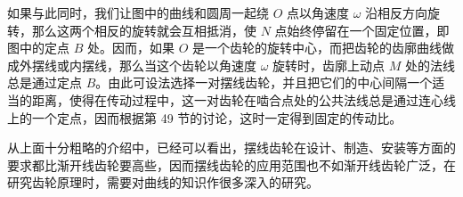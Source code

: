 \vspace{4pt}
如果与此同时，我们让图中的曲线和圆周一起绕 $O$ 点以角速度 $\omega$ 沿相反方向旋转，那么这两个相反的旋转就会互相抵消，使 $N$ 点始终停留在一个固定位置，即图中的定点 $B$ 处。因而，如果 $O$ 是一个齿轮的旋转中心，而把齿轮的齿廓曲线做成外摆线或内摆线，那么当这个齿轮以角速度 $\omega$ 旋转时，齿廓上动点 $M$ 处的法线总是通过定点 $B$。由此可设法选择一对摆线齿轮，并且把它们的中心间隔一个适当的距离，使得在传动过程中，这一对齿轮在啮合点处的公共法线总是通过连心线上的一个定点，因而根据第 49 节的讨论，这时一定得到固定的传动比。

从上面十分粗略的介绍中，已经可以看出，摆线齿轮在设计、制造、安装等方面的要求都比渐开线齿轮要高些，因而摆线齿轮的应用范围也不如渐开线齿轮广泛，在研究齿轮原理时，需要对曲线的知识作很多深入的研究。
